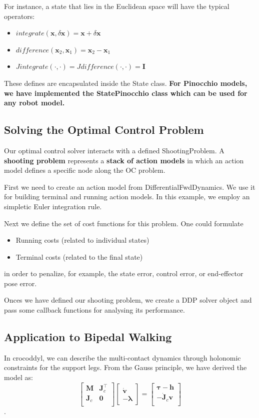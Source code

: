 For instance, a state that lies in the Euclidean space will have the typical operators:
\begin{itemize}
\item $integrate(\mathbf{x},\delta\mathbf{x}) = \mathbf{x} + \delta\mathbf{x}$
\item $difference(\mathbf{x}_2,\mathbf{x}_1) = \mathbf{x}_2 - \mathbf{x}_1$
\item $Jintegrate(\cdot,\cdot) = Jdifference(\cdot,\cdot) = \mathbf{I}$
\end{itemize}

These defines are encapsulated inside the State class. \textbf{For Pinocchio models, we have implemented the StatePinocchio class which can be used for any robot model.}

\subsection{Solving the Optimal Control Problem}
Our optimal control solver interacts with a defined ShootingProblem. A \textbf{shooting problem} represents a \textbf{stack of action models} in which an action model defines a specific node along the OC problem.

First we need to create an action model from DifferentialFwdDynamics. We use it for building terminal and running action models. In this example, we employ an simpletic Euler integration rule.

Next we define the set of cost functions for this problem. One could formulate
\begin{itemize}
\item Running costs (related to individual states)
\item Terminal costs (related to the final state)
\end{itemize}
in order to penalize, for example, the state error, control error, or end-effector pose error. 

Onces we have defined our shooting problem, we create a DDP solver object and pass some callback functions for analysing its performance.


\subsection{Application to Bipedal Walking}
In crocoddyl, we can describe the multi-contact dynamics through holonomic constraints for the support legs. From the Gauss principle, we have derived the model as:
$$
\left[\begin{matrix}
 \mathbf{M} & \mathbf{J}^{\top}_c \\
 {\mathbf{J}_{c}} & \mathbf{0} \\
\end{matrix}\right]
\left[\begin{matrix}
 \dot{\mathbf{v}} \\ -\boldsymbol{\lambda}
\end{matrix}\right]
 = 
\left[\begin{matrix}
  \boldsymbol{\tau} - \mathbf{h} \\
  -\dot{\mathbf{J}}_c \mathbf{v} \\
\end{matrix}\right]$$.

